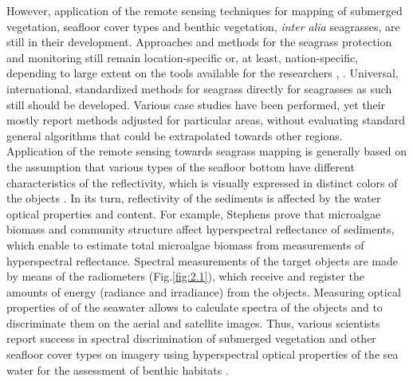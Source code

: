 \documentclass[11pt]{article}
\begin{document}
However, application of the remote sensing techniques for mapping of submerged vegetation,
seafloor cover types and benthic vegetation, \textit{inter alia} seagrasses, are still in their development.
Approaches and methods for the seagrass protection and monitoring still remain location-specific or, at
least, nation-specific, depending to large extent on the tools available for the researchers \cite{Bakran-Petricioli06}\label{Bakran-Petricioli06}, \cite{Mellors09a}\label{Mellors09a}.
Universal, international, standardized methods for seagrass directly for seagrasses
as such still should be developed. Various case studies have been performed, yet their mostly report
methods adjusted for particular areas, without evaluating standard general algorithms that could be
extrapolated towards other regions. \\ Application of the remote sensing towards seagrass mapping is
generally based on the assumption that various types of the seafloor bottom have different
characteristics of the reflectivity, which is visually expressed in distinct colors of the objects \cite{Richardson06}\label{Richardson06}. In its
turn, reflectivity of the sediments is affected by the water optical properties and content. For
example, Stephens \cite{Stephens03}\label{Stephens03} prove that microalgae biomass and community structure affect
hyperspectral reflectance of sediments, which enable to estimate total microalgae biomass from
measurements of hyperspectral reflectance. 
Spectral measurements of the target objects are made
by means of the radiometers (Fig.\ref{fig:2.1})\label{page-17}, which receive and register the amounts of energy (radiance and
irradiance) from the objects. Measuring optical properties of of the seawater allows to calculate spectra of the
objects and to discriminate them on the aerial and satellite images. Thus, various scientists report
success in spectral discrimination of submerged vegetation and other seafloor cover types on imagery
using hyperspectral optical properties of the sea water for the assessment of benthic habitats \cite{Lewis01,Louchard03,Dehouck08,Werdell03}\label{Lewis01}\label{Louchard03}\label{Dehouck08}\label{Werdell03}.
\end{document}
